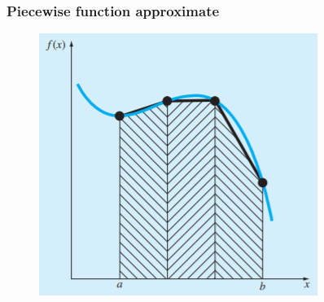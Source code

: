 \documentclass{if-beamer}
\begin{document}
\begin{frame}
	\frametitle{Piecewise function approximate}
	\begin{figure}
		\centering
		\includegraphics[width = .7\textwidth]{figures/Pieceise}
	\end{figure}
\end{frame}
\end{document}
